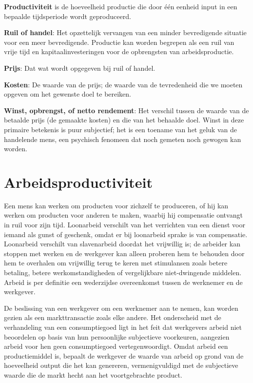 \textbf{Productiviteit} is de hoeveelheid productie die door één eenheid
input in een bepaalde tijdsperiode wordt geproduceerd.

\textbf{Ruil of handel}: Het opzettelijk vervangen van een minder
bevredigende situatie voor een meer bevredigende. Productie kan worden
begrepen als een ruil van vrije tijd en kapitaalinvesteringen voor de
opbrengsten van arbeidsproductie.

\textbf{Prijs}: Dat wat wordt opgegeven bij ruil of handel.

\textbf{Kosten}: De waarde van de prijs; de waarde van de tevredenheid
die we moeten opgeven om het gewenste doel te bereiken.

\textbf{Winst, opbrengst, of netto rendement}: Het verschil tussen de
waarde van de betaalde prijs (de gemaakte kosten) en die van het
behaalde doel. Winst in deze primaire betekenis is puur subjectief; het
is een toename van het geluk van de handelende mens, een psychisch
fenomeen dat noch gemeten noch gewogen kan worden.


\section{Arbeidsproductiviteit}

Een mens kan werken om producten voor zichzelf te produceren, of hij kan
werken om producten voor anderen te maken, waarbij hij compensatie
ontvangt in ruil voor zijn tijd. Loonarbeid verschilt van het verrichten
van een dienst voor iemand als gunst of geschenk, omdat er bij
loonarbeid sprake is van compensatie. Loonarbeid verschilt van
slavenarbeid doordat het vrijwillig is; de arbeider kan stoppen met
werken en de werkgever kan alleen proberen hem te behouden door hem te overhalen om vrijwillig terug te keren met stimulansen zoals
betere betaling, betere werkomstandigheden of vergelijkbare
niet-dwingende middelen. Arbeid is per definitie een wederzijdse
overeenkomst tussen de werknemer en de werkgever.

De beslissing van een werkgever om een werknemer aan te nemen, kan worden gezien als een markttransactie zoals elke andere. Het onderscheid met de verhandeling van een consumptiegoed ligt in het feit dat werkgevers arbeid niet beoordelen op basis van hun persoonlijke subjectieve voorkeuren, aangezien arbeid voor hen geen consumptiegoed vertegenwoordigt. Omdat arbeid een productiemiddel is, bepaalt de werkgever de waarde van arbeid op grond van de hoeveelheid output die het kan genereren, vermenigvuldigd met de subjectieve waarde die de markt hecht aan het voortgebrachte product.

